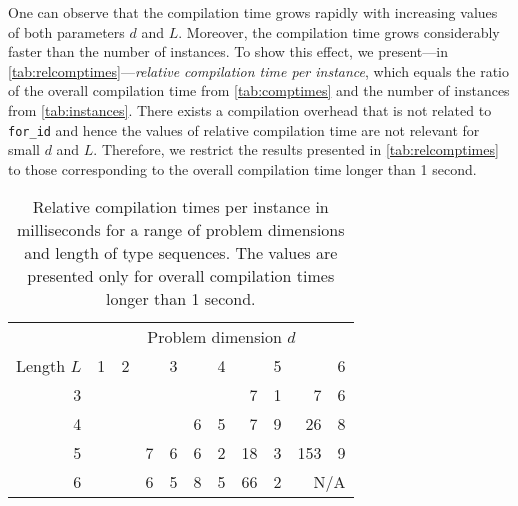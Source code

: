 \documentclass[10pt,a4paper]{article}
\theoremstyle{definition}\newtheorem{problem}{Problem}
\providecommand{\forid}{\texttt{for\_id}\xspace}
\begin{document}
One can observe that the compilation time grows rapidly with increasing values of both parameters $d$ and $L$. Moreover, the compilation time grows considerably faster than the number of instances. To show this effect, we present---in \autoref{tab:relcomptimes}---\emph{relative compilation time per instance}, which equals the ratio of the overall compilation time from \autoref{tab:comptimes} and the number of instances from \autoref{tab:instances}. There exists a compilation overhead that is not related to \forid and hence the values of relative compilation time are not relevant for small $d$ and $L$. Therefore, we restrict the results presented in \autoref{tab:relcomptimes} to those corresponding to the overall compilation time longer than 1 second.
\renewcommand{\arraystretch}{1.00}
\renewcommand{\tabcolsep}{3mm}
\begin{table}[t]
\caption{Relative compilation times per instance in milliseconds for a range of problem dimensions and length of type sequences. The values are presented only for overall compilation times longer than 1 second.}
\begin{center}
\begin{tabular}{r*{6}{r@{.}l}}
\toprule
 & \multicolumn{12}{c}{Problem dimension $d$} \\ \cmidrule(l){2-13}
Length $L$ & \multicolumn{2}{r}{1} & \multicolumn{2}{r}{2} & \multicolumn{2}{r}{3} & \multicolumn{2}{r}{4} & \multicolumn{2}{r}{5} & \multicolumn{2}{r}{6} \\ \cmidrule(r){1-1} \cmidrule(l){2-13}
3 & \multicolumn{2}{c}{} & \multicolumn{2}{c}{} & \multicolumn{2}{c}{} & \multicolumn{2}{c}{} & 7 & 1 & 7 & 6 \\
4 & \multicolumn{2}{c}{} & \multicolumn{2}{c}{} & \multicolumn{2}{c}{} & 6 & 5 & 7  & 9 & 26  & 8 \\
5 & \multicolumn{2}{c}{} & \multicolumn{2}{c}{} & 7 & 6 & 6 & 2 & 18 & 3 & 153 & 9 \\
6 & \multicolumn{2}{c}{} & \multicolumn{2}{c}{} & 6 & 5 & 8 & 5 & 66 & 2 & \multicolumn{2}{r}{N/A} \\
\bottomrule
\end{tabular}
\end{center}
\label{tab:relcomptimes}
\end{table}
\end{document}
